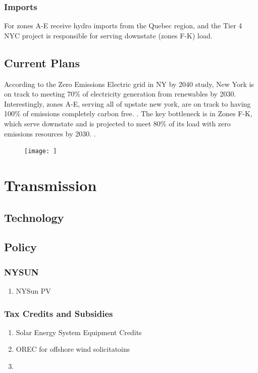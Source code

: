 \documentclass[plain]{article}
\newcommand{\1}{\mathbbm{1}}
\begin{document}
\subsubsection{Imports}
For zones A-E receive hydro imports from the Quebec region, and the Tier 4 NYC project is responsible for serving downstate (zones F-K) load.
\subsection{Current Plans}
According to the Zero Emissions Electric grid in NY by 2040 study, New York is on track to meeting 70\% of electricity generation from renewables by 2030. Interestingly, zones A-E, serving all of upstate new york, are on track to having 100\% of emissions completely carbon free. . The key bottleneck is in Zones F-K, which serve downstate and is projected to meet 80\% of its load with zero emissions resources by 2030. .


\begin{figure}[H]
	\centering
	\texttt{[image: ]}
	\caption{}
	\label{fig:}
\end{figure}

\section{Transmission}


\subsection{Technology}

\subsection{Policy}
\subsubsection{NYSUN}
\begin{enumerate}
	\item NYSun PV
\end{enumerate}
\subsubsection{Tax Credits and Subsidies}
\begin{enumerate}
	\item Solar Energy System Equipment Credits
	\item OREC for offshore wind solicitatoins
	\item 
\end{enumerate}
\end{document}
